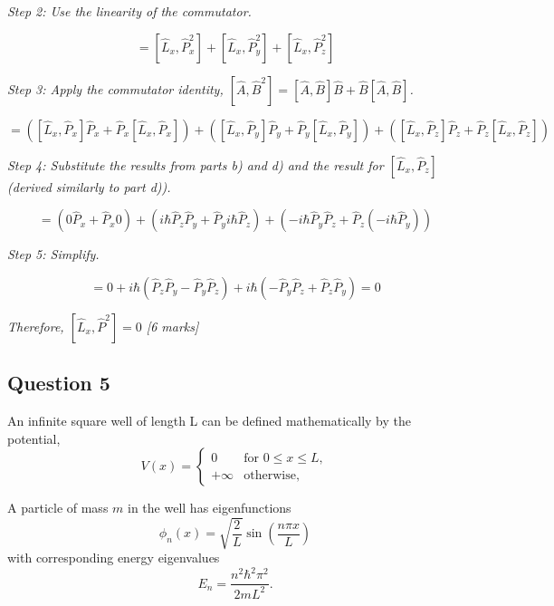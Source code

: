 \documentclass{article}
\begin{document}
\textit{Step 2: Use the linearity of the commutator.}

\begin{equation}
[\hat{L}_x, \hat{P}^2] = [\hat{L}_x, \hat{P}_x^2] + [\hat{L}_x, \hat{P}_y^2] + [\hat{L}_x, \hat{P}_z^2]
\end{equation}

\textit{Step 3: Apply the commutator identity, $[\hat{A}, \hat{B}^2] = [\hat{A}, \hat{B}]\hat{B} + \hat{B}[\hat{A}, \hat{B}]$.}

\begin{equation}
[\hat{L}_x, \hat{P}^2] = ([\hat{L}_x, \hat{P}_x]\hat{P}_x + \hat{P}_x[\hat{L}_x, \hat{P}_x]) + ([\hat{L}_x, \hat{P}_y]\hat{P}_y + \hat{P}_y[\hat{L}_x, \hat{P}_y]) + ([\hat{L}_x, \hat{P}_z]\hat{P}_z + \hat{P}_z[\hat{L}_x, \hat{P}_z])
\end{equation}

\textit{Step 4: Substitute the results from parts b) and d) and the result for $[\hat{L}_x, \hat{P}_z]$ (derived similarly to part d)).}

\begin{equation}
[\hat{L}_x, \hat{P}^2] = (0\hat{P}_x + \hat{P}_x0) + (i\hbar \hat{P}_z \hat{P}_y + \hat{P}_y i\hbar \hat{P}_z) + (-i\hbar \hat{P}_y \hat{P}_z + \hat{P}_z (-i\hbar \hat{P}_y))
\end{equation}

\textit{Step 5: Simplify.}

\begin{equation}
[\hat{L}_x, \hat{P}^2] = 0 + i\hbar(\hat{P}_z\hat{P}_y - \hat{P}_y\hat{P}_z) + i\hbar(-\hat{P}_y\hat{P}_z + \hat{P}_z\hat{P}_y) = 0
\end{equation}

\textit{Therefore, $[\hat{L}_x, \hat{P}^2] = 0$ [6 marks]}

\subsection{Question 5}
An infinite square well of length L can be defined mathematically by the potential,
\[
V(x) = 
\begin{cases} 
0 & \text{for } 0 \leq x \leq L, \\
+\infty & \text{otherwise},
\end{cases}
\]

A particle of mass \(m\) in the well has eigenfunctions
\[
\phi_n(x) = \sqrt{\frac{2}{L}} \sin\left(\frac{n \pi x}{L}\right)
\]
with corresponding energy eigenvalues
\[
E_n = \frac{n^2 \hbar^2 \pi^2}{2mL^2}.
\]
\end{document}
